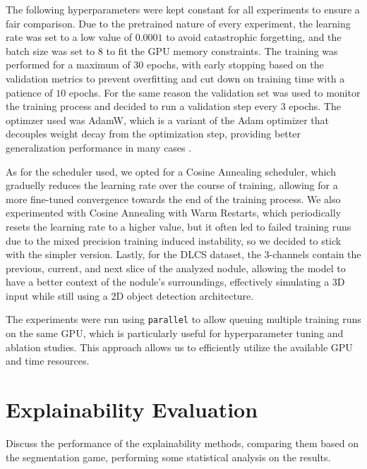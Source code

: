 The following hyperparameters were kept constant for all experiments to ensure a fair comparison.
Due to the pretrained nature of every experiment, the learning rate was set to a low value of $0.0001$ to avoid catastrophic forgetting, and the batch size was set to $8$ to fit the GPU memory constraints. The training was performed for a maximum of $30$ epochs, with early stopping based on the validation metrics to prevent overfitting and cut down on training time with a patience of $10$ epochs. For the same reason the validation set was used to monitor the training process and decided to run a validation step every $3$ epochs.
The optimzer used was AdamW, which is a variant of the Adam optimizer that decouples weight decay from the optimization step, providing better generalization performance in many cases \cite{loshchilov2019decoupled, kingma2017adam}.

As for the scheduler used, we opted for a Cosine Annealing scheduler, which graduelly reduces the learning rate over the course of training, allowing for a more fine-tuned convergence towards the end of the training process. We also experimented with Cosine Annealing with Warm Restarts, which periodically resets the learning rate to a higher value, but it often led to failed training runs due to the mixed precision training induced instability, so we decided to stick with the simpler version.
Lastly, for the DLCS dataset, the 3-channels contain the previous, current, and next slice of the analyzed nodule, allowing the model to have a better context of the nodule's surroundings, effectively simulating a 3D input while still using a 2D object detection architecture.

The experiments were run using \texttt{parallel} to allow queuing multiple training runs on the same GPU, which is particularly useful for hyperparameter tuning and ablation studies. This approach allows us to efficiently utilize the available GPU and time resources.



\section{Explainability Evaluation}
Discuss the performance of the explainability methods, comparing them based on the segmentation game, performing some statistical analysis on the results.
